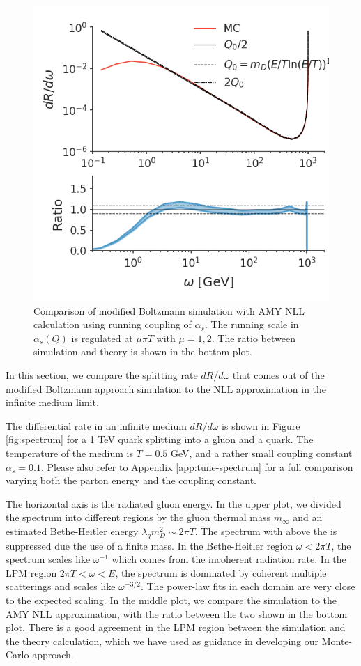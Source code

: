 \documentclass[aps, prc, reprint, amsmath, groupedaddress, nofootinbib]{revtex4-1}
\begin{document}
\begin{figure}
\includegraphics[width=\columnwidth]{running.png}
\caption{Comparison of modified Boltzmann simulation with AMY NLL calculation using running coupling of $\alpha_s$. The running scale in $\alpha_s(Q)$ is regulated at $\mu\pi T$ with $\mu=1,2$. The ratio between simulation and theory is shown in the bottom plot.}
\label{fig:running}
\end{figure}

In this section, we compare the splitting rate $dR/d\omega$ that comes out of the modified Boltzmann approach simulation to the NLL approximation in the infinite medium limit.

The differential rate in an infinite medium $dR/d\omega$ is shown in Figure \ref{fig:spectrum} for a 1 TeV quark splitting into a gluon and a quark.
The temperature of the medium is $T=0.5$ GeV, and a rather small coupling constant $\alpha_s = 0.1$.
Please also refer to Appendix \ref{app:tune-spectrum} for a full comparison varying both the parton energy and the coupling constant.

The horizontal axis is the radiated gluon energy.
In the upper plot, we divided the spectrum into different regions by the gluon thermal mass $m_\infty$ and an estimated Bethe-Heitler energy $\lambda_g m_D^2 \sim 2\pi T$.
The spectrum with above the is suppressed due the use of a finite mass.
In the Bethe-Heitler region $\omega < 2\pi T$, the spectrum scales like $\omega^{-1}$ which comes from the incoherent radiation rate.
In the LPM region $2\pi T < \omega < E$, the spectrum is dominated by coherent multiple scatterings and scales like $\omega^{-3/2}$.
The power-law fits in each domain are very close to the expected scaling.
In the middle plot, we compare the simulation to the AMY NLL approximation, with the ratio between the two shown in the bottom plot.
There is a good agreement in the LPM region between the simulation and the theory calculation, which we have used as guidance in developing our Monte-Carlo approach.
\end{document}

